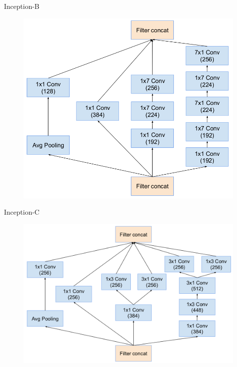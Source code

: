 \documentclass[compress]{beamer}
\begin{document}
\begin{frame}{Inception-B}
\begin{figure}[H]
\includegraphics[scale=0.3]{inceptionB.png}
\end{figure}
\end{frame}

\begin{frame}{Inception-C}
\begin{figure}[H]
\includegraphics[scale=0.29]{inceptionC.png}
\end{figure}
\end{frame}
\end{document}
